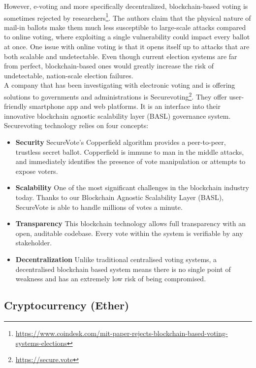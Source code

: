 \documentclass[10pt]{article}
\begin{document}
\begin{multicols}{2}
However, e-voting and more specifically decentralized, blockchain-based voting is sometimes rejected by researchers\footnote{\url{https://www.coindesk.com/mit-paper-rejects-blockchain-based-voting-systems-elections}}. The authors claim that the physical nature of mail-in ballots make them much less susceptible to large-scale attacks compared to online voting, where exploiting a single vulnerability could impact every ballot at once. One issue with online voting is that it opens itself up to attacks that are both scalable and undetectable. Even though current election systems are far from perfect, blockchain-based ones would greatly increase the risk of undetectable, nation-scale election failures.\\

A company that has been investigating with electronic voting and is offering solutions to governments and administrations is Securevoting\footnote{\url{https://secure.vote}}. They offer user-friendly smartphone app and web platforms. It is an interface into their innovative blockchain agnostic scalability layer (BASL) governance system.\\

Securevoting technology relies on four concepts:

\begin{itemize}
	\item \textbf{Security} SecureVote’s Copperfield algorithm provides a peer-to-peer, trustless secret ballot. Copperfield is immune to man in the middle attacks, and immediately identifies the presence of vote manipulation or attempts to expose voters.
	\item \textbf{Scalability} One of the most significant challenges in the blockchain industry today. Thanks to our Blockchain Agnostic Scalability Layer (BASL), SecureVote is able to handle millions of votes a minute.
	\item \textbf{Transparency} This blockchain technology allows full transparency with an open, auditable codebase. Every vote within the system is verifiable by any stakeholder.
	\item \textbf{Decentralization} Unlike traditional centralised voting systems, a decentralised blockchain based system means there is no single point of weakness and has an extremely low risk of being compromised.
\end{itemize}

\subsection{Cryptocurrency (Ether)}


\end{multicols}
\end{document}
